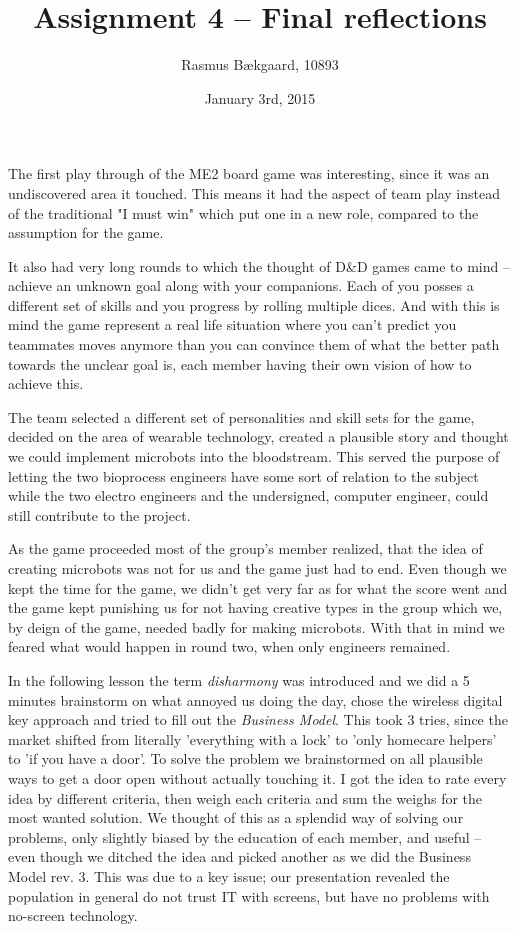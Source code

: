 \documentclass[oneside, 12pt]{article}
\title{Assignment 4 --  Final reflections}
\author{Rasmus Bækgaard, 10893}
\date{January 3rd, 2015}
\begin{document}
\maketitle

The first play through  of the ME2 board game was interesting, since it was an undiscovered area it touched. 
This means it had the aspect of team play instead of the traditional "I must win" which put one in a new role, compared to the assumption for the game.

It also had very long rounds to which the thought of D\&D games came to mind -- achieve an unknown goal along with your companions. 
Each of you posses a different set of skills and you progress by rolling multiple dices. 
And with this is mind the game represent a real life situation where you can't predict you  teammates moves anymore than you can convince them of what the better path towards the unclear goal is, each member having their own vision of how to achieve this.

The team selected a different set of personalities and skill sets for the game, decided on the area of wearable technology, created a plausible story and thought we could implement microbots into the bloodstream. 
This served the purpose of letting the two bioprocess engineers have some sort of relation to the subject while the two electro engineers and the undersigned, computer engineer, could still contribute to the project.

As the game proceeded most of the group's member realized, that the idea of creating microbots was not for us and the game just had to end.
Even though we kept the time for the game, we didn't get very far as for what the score went and the game kept punishing us for not having creative types in the group which we, by deign of the game, needed badly for making microbots.
With that in mind we feared what would happen in round two, when only engineers remained.

In the following lesson the term \textit{disharmony} was introduced and we did a 5 minutes brainstorm on what annoyed us doing the day, chose the wireless digital key approach and tried to fill out the \textit{Business Model}.
This took 3 tries, since the market shifted from literally 'everything with a lock' to 'only homecare helpers' to 'if you have a door'. 
To solve the problem we brainstormed on all plausible ways to get a door open without actually touching it.
I got the idea to  rate every idea by different criteria, then weigh each criteria and sum the weighs for the most wanted solution. 
We thought of this as a splendid way of solving our problems, only slightly biased by the education of each member, and useful -- even though we ditched the idea and picked another as we did the Business Model rev. 3.
This was due to a key issue; our presentation revealed the population in general do not trust IT with screens, but have no problems with no-screen technology.
\end{document}
